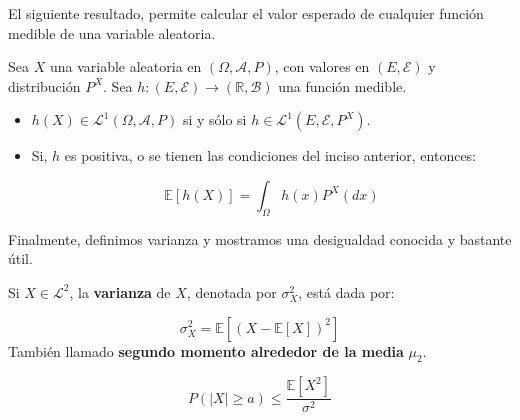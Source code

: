 El siguiente resultado, permite calcular el valor esperado de cualquier función medible de una variable aleatoria.
	
\begin{theorem}
	Sea $X$ una variable aleatoria en $(\Omega, \mathcal{A}, P)$, con valores en $(E, \mathcal{E})$ y distribución $P^X$. Sea $h: (E, \mathcal{E}) \rightarrow (\mathbb{R}, \mathcal{B})$ una función medible.

	\begin{itemize}
		\item $h(X) \in \mathcal{L}^1 (\Omega, \mathcal{A}, P)$ si y sólo si $h \in \mathcal{L}^1 (E, \mathcal{E}, P^X )$.
		\item Si, $h$ es positiva, o se tienen las condiciones del inciso anterior, entonces:

		\[
			\mathbb{E}[h(X)] = \int_{\Omega} h(x) P^X(dx)
		\] 
	\end{itemize}

\end{theorem}

Finalmente, definimos varianza y mostramos una desigualdad conocida y bastante útil.

\begin{boxDef}
	Si $X \in \mathcal{L}^2$, la \textbf{varianza} de $X$, denotada por $\sigma_X^2$, está dada por:

	\[
		\sigma_X^2 = \mathbb{E}[ (X - \mathbb{E}[X])^2 ]
	\] 
	También llamado \textbf{segundo momento alrededor de la media} $\mu_2$.
\end{boxDef}


\begin{theorem}
	\[ P( \lvert X\rvert \geq a ) \leq \frac{ \mathbb{E}[X^2] }{ \sigma^2 } \]
\end{theorem}






































